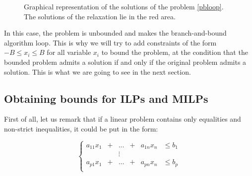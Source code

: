 \documentclass{article}
\begin{document}
\begin{figure}[h]
  \centering


  \label{bbloop}
  \caption{Graphical representation of the solutions of the problem
           \ref{pbloop}. The solutions of the relaxation lie in the red area.}
\end{figure}

In this case, the problem is unbounded and makes the branch-and-bound algorithm
loop. This is why we will try to add constraints of the form $-B \leqslant x_i
\leqslant B$ for all variable $x_i$ to bound the problem, at the condition that
the bounded problem admits a solution if and only if the original problem admits
a solution. This is what we are going to see in the next section.

\subsection{Obtaining bounds for ILPs and MILPs}
\label{schrijverbnd}
First of all, let us remark that if a linear problem contains only equalities and 
non-strict inequalities, 
it could be put in the form:

\begin{displaymath}
  \left\{
  \begin{array}{cccccl}
    a_{11} x_1 & + & ...    & + & a_{1n} x_n & \leqslant b_1 \\
               &   & \vdots &   &            &               \\
    a_{p1} x_1 & + & ...    & + & a_{pn} x_n & \leqslant b_p \\
  \end{array}
  \right.
\end{displaymath}
\end{document}

